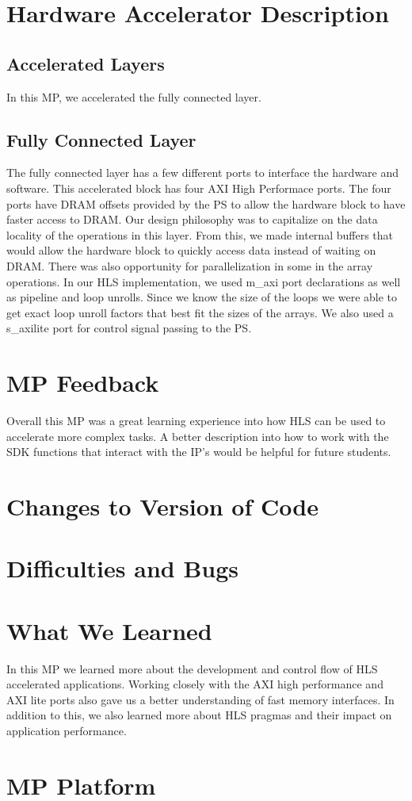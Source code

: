 \documentclass{document}  %
\begin{document}
\section{Hardware Accelerator Description}
\subsection{Accelerated Layers}
In this MP, we accelerated the fully connected layer. 

\subsection{Fully Connected Layer}
The fully connected layer has a few different ports to interface the hardware and software. This accelerated block has four AXI High Performace ports. The four ports have DRAM offsets provided by the PS to allow the hardware block to have faster access to DRAM. Our design philosophy was to capitalize on the data locality of the operations in this layer. From this, we made internal buffers that would allow the hardware block to quickly access data instead of waiting on DRAM. There was also opportunity for parallelization in some in the array operations. In our HLS implementation, we used m\_axi port declarations as well as pipeline and loop unrolls. Since we know the size of the loops we were able to get exact loop unroll factors that best fit the sizes of the arrays. We also used a s\_axilite port for control signal passing to the PS. 



\section{MP Feedback}
Overall this MP was a great learning experience into how HLS can be used to accelerate more complex tasks. A better description into how to work with the SDK functions that interact with the IP's would be helpful for future students. 



\section{Changes to Version of Code}


\section{Difficulties and Bugs}



\section{What We Learned}
In this MP we learned more about the development and control flow of HLS accelerated applications. Working closely with the AXI high performance and AXI lite ports also gave us a better understanding of fast memory interfaces. In addition to this, we also learned more about HLS pragmas and their impact on application performance. 


\section{MP Platform}
\end{document}
